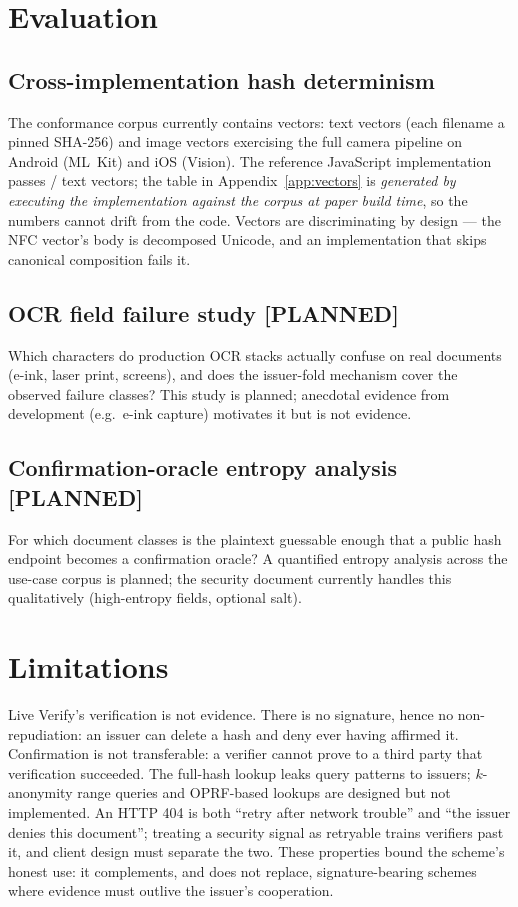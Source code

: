 \documentclass[11pt]{article}
\begin{document}
\section{Evaluation}\label{sec:eval}

\subsection{Cross-implementation hash determinism}
The conformance corpus currently contains \VectorTotal{} vectors:
\TextVectorCount{} text vectors (each filename a pinned SHA-256) and
\ImageVectorCount{} image vectors exercising the full camera pipeline on
Android (ML~Kit) and iOS (Vision). The reference JavaScript implementation
passes \TextVectorPasses/\TextVectorCount{} text vectors; the table in
Appendix~\ref{app:vectors} is \emph{generated by executing the implementation
against the corpus at paper build time}, so the numbers cannot drift from the
code. Vectors are discriminating by design --- the NFC vector's body is
decomposed Unicode, and an implementation that skips canonical composition
fails it.

\subsection{OCR field failure study [PLANNED]}
Which characters do production OCR stacks actually confuse on real documents
(e-ink, laser print, screens), and does the issuer-fold mechanism cover the
observed failure classes? This study is planned; anecdotal evidence from
development (e.g.\ e-ink capture) motivates it but is not evidence.

\subsection{Confirmation-oracle entropy analysis [PLANNED]}
For which document classes is the plaintext guessable enough that a public
hash endpoint becomes a confirmation oracle? A quantified entropy analysis
across the use-case corpus is planned; the security document currently
handles this qualitatively (high-entropy fields, optional salt).

\section{Limitations}\label{sec:limits}

Live Verify's verification is not evidence. There is no signature, hence no
non-repudiation: an issuer can delete a hash and deny ever having affirmed
it. Confirmation is not transferable: a verifier cannot prove to a third
party that verification succeeded. The full-hash lookup leaks query patterns
to issuers; $k$-anonymity range queries \cite{ali2018hibp} and OPRF-based
lookups are designed but not implemented. An HTTP 404 is both ``retry after
network trouble'' and ``the issuer denies this document''; treating a
security signal as retryable trains verifiers past it, and client design must
separate the two. These properties bound the scheme's honest use: it
complements, and does not replace, signature-bearing schemes where evidence
must outlive the issuer's cooperation.
\end{document}
